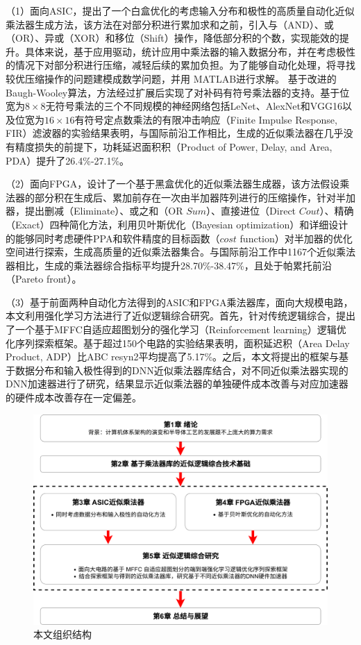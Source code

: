 （1）面向ASIC，提出了一个白盒优化的考虑输入分布和极性的高质量自动化近似乘法器生成方法，该方法在对部分积进行累加求和之前，引入与（AND）、或（OR）、异或（XOR）和移位（Shift）操作，降低部分积的个数，实现能效的提升。具体来说，基于应用驱动，统计应用中乘法器的输入数据分布，并在考虑极性的情况下对部分积进行压缩，减轻后续的累加负担。为了能够自动化处理，将寻找较优压缩操作的问题建模成数学问题，并用 MATLAB进行求解。
基于改进的Baugh-Wooley算法\cite{EM:baugh-wooley,EM:baugh-wooley_modified_PP_reorga,EM:baugh-wooley_diff}，方法经过扩展后实现了对补码有符号乘法器的支持。基于位宽为$8\times8$无符号乘法的三个不同规模的神经网络包括LeNet、AlexNet和VGG16以及位宽为$16\times16$有符号定点数乘法的有限冲击响应（Finite Impulse Response, FIR）滤波器的实验结果表明，与国际前沿工作相比，生成的近似乘法器在几乎没有精度损失的前提下，功耗延迟面积积（Product of Power, Delay, and Area, PDA）提升了26.4\%-27.1\%。

（2）面向FPGA，设计了一个基于黑盒优化的近似乘法器生成器，该方法假设乘法器的部分积在生成后、累加前存在一次由半加器阵列进行的压缩操作，针对半加器，提出删减（Eliminate）、或之和（OR $Sum$）、直接进位（Direct $Cout$）、精确（Exact）四种简化方法，利用贝叶斯优化（Bayesian optimization）和详细设计的能够同时考虑硬件PPA和软件精度的目标函数（$cost$ function）对半加器的优化空间进行探索，生成高质量的近似乘法器集合。与国际前沿工作中1167个近似乘法器相比，生成的乘法器综合指标平均提升28.70\%-38.47\%，且处于帕累托前沿（Pareto front）。

（3）基于前面两种自动化方法得到的ASIC和FPGA乘法器库，面向大规模电路，本文利用强化学习方法进行了近似逻辑综合研究。首先，针对传统逻辑综合，提出了一个基于MFFC自适应超图划分的强化学习（Reinforcement learning）逻辑优化序列探索框架。基于超过150个电路的实验结果表明，面积延迟积（Area Delay Product, ADP）比ABC\cite{LS:ABC} resyn2平均提高了5.17\%。之后，本文将提出的框架与基于数据分布和输入极性得到的DNN近似乘法器库结合，对不同近似乘法器实现的DNN加速器进行了研究，结果显示近似乘法器的单独硬件成本改善与对应加速器的硬件成本改善存在一定偏差。

\begin{figure}[!htb]
    \centering
    \includegraphics[width=\textwidth]{figs/论文结构.pdf}
    \caption{本文组织结构}
    \label{本文组织结构}
\end{figure}

